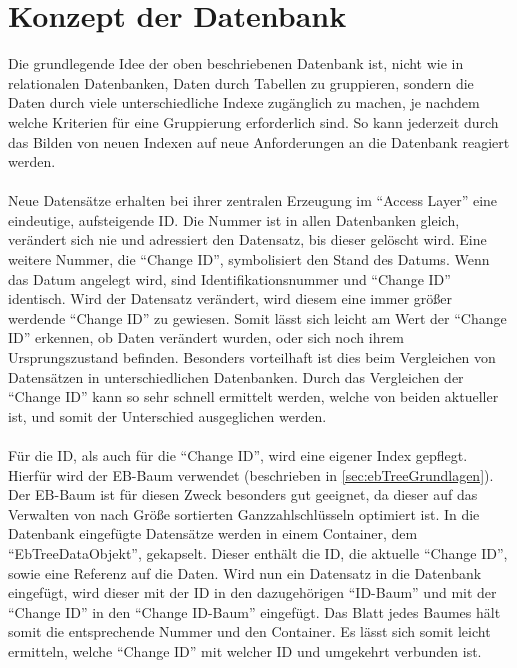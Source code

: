\documentclass[a4paper,11pt,oneside,%
headsepline,												%
footsepline,												%
bibtotocnumbered									%
]{scrreprt}
\begin{document}
\section{Konzept der Datenbank}
\label{sec:DBConcept} 
Die grundlegende Idee der oben beschriebenen Datenbank ist, nicht wie in relationalen Datenbanken, Daten durch Tabellen zu gruppieren, sondern die Daten durch viele unterschiedliche Indexe zugänglich zu machen, je nachdem welche Kriterien für eine Gruppierung erforderlich sind. So kann jederzeit durch das Bilden von neuen Indexen auf neue Anforderungen an die Datenbank reagiert werden.\\\\
Neue Datensätze erhalten bei ihrer zentralen Erzeugung im \enquote{Access Layer} eine eindeutige, aufsteigende \ac{ID}. Die Nummer ist in allen Datenbanken gleich, verändert sich nie und adressiert den Datensatz, bis dieser gelöscht wird. Eine weitere Nummer, die \enquote{Change ID}, symbolisiert den Stand des Datums. Wenn das Datum angelegt wird, sind Identifikationsnummer und \enquote{Change ID} identisch. Wird der Datensatz verändert, wird diesem eine immer größer werdende \enquote{Change ID} zu gewiesen. Somit lässt sich leicht am Wert der \enquote{Change ID}  erkennen, ob Daten verändert wurden, oder sich noch ihrem Ursprungszustand befinden. Besonders vorteilhaft ist dies beim Vergleichen von Datensätzen in unterschiedlichen Datenbanken. Durch das Vergleichen der \enquote{Change ID} kann so sehr schnell ermittelt werden, welche von beiden aktueller ist, und somit der Unterschied ausgeglichen werden.\\\\
Für die \ac{ID}, als auch für die \enquote{Change ID}, wird eine eigener Index gepflegt. Hierfür wird der \ac{EB-Baum} verwendet (beschrieben in \autoref{sec:ebTreeGrundlagen}). Der \ac{EB-Baum} ist für diesen Zweck besonders gut geeignet, da dieser auf das Verwalten von nach Größe sortierten Ganzzahlschlüsseln optimiert ist. In die Datenbank eingefügte Datensätze werden in einem Container, dem \enquote{EbTreeDataObjekt}, gekapselt. Dieser enthält  die \ac{ID}, die aktuelle \enquote{Change ID}, sowie eine Referenz auf die Daten. Wird nun ein Datensatz in die Datenbank eingefügt, wird dieser mit der \ac{ID} in den dazugehörigen \enquote{ID-Baum} und mit der \enquote{Change ID} in den \enquote{Change ID-Baum} eingefügt. Das Blatt jedes Baumes hält somit die entsprechende Nummer und den Container. Es lässt sich somit leicht ermitteln, welche \enquote{Change ID} mit welcher \ac{ID} und umgekehrt verbunden ist. \\\\
\end{document}
